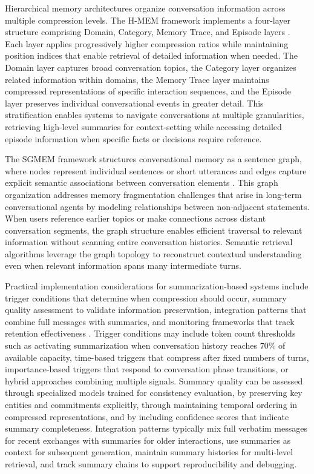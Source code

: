 Hierarchical memory architectures organize conversation information across multiple compression levels. The H-MEM framework implements a four-layer structure comprising Domain, Category, Memory Trace, and Episode layers \citep{wang2024hmem}. Each layer applies progressively higher compression ratios while maintaining position indices that enable retrieval of detailed information when needed. The Domain layer captures broad conversation topics, the Category layer organizes related information within domains, the Memory Trace layer maintains compressed representations of specific interaction sequences, and the Episode layer preserves individual conversational events in greater detail. This stratification enables systems to navigate conversations at multiple granularities, retrieving high-level summaries for context-setting while accessing detailed episode information when specific facts or decisions require reference.

The SGMEM framework structures conversational memory as a sentence graph, where nodes represent individual sentences or short utterances and edges capture explicit semantic associations between conversation elements \citep{liu2024sgmem}. This graph organization addresses memory fragmentation challenges that arise in long-term conversational agents by modeling relationships between non-adjacent statements. When users reference earlier topics or make connections across distant conversation segments, the graph structure enables efficient traversal to relevant information without scanning entire conversation histories. Semantic retrieval algorithms leverage the graph topology to reconstruct contextual understanding even when relevant information spans many intermediate turns.

Practical implementation considerations for summarization-based systems include trigger conditions that determine when compression should occur, summary quality assessment to validate information preservation, integration patterns that combine full messages with summaries, and monitoring frameworks that track retention effectiveness \citep{ibrahim2025strategies}. Trigger conditions may include token count thresholds such as activating summarization when conversation history reaches 70\% of available capacity, time-based triggers that compress after fixed numbers of turns, importance-based triggers that respond to conversation phase transitions, or hybrid approaches combining multiple signals. Summary quality can be assessed through specialized models trained for consistency evaluation, by preserving key entities and commitments explicitly, through maintaining temporal ordering in compressed representations, and by including confidence scores that indicate summary completeness. Integration patterns typically mix full verbatim messages for recent exchanges with summaries for older interactions, use summaries as context for subsequent generation, maintain summary histories for multi-level retrieval, and track summary chains to support reproducibility and debugging.


